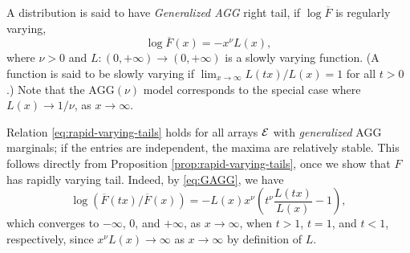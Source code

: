 % 

\begin{example} \label{exmp:AGG}
A distribution is said to have \emph{Generalized AGG} right tail, if $\log{\overline{F}}$ is regularly varying,
\begin{equation} \label{eq:GAGG}
    \log{\overline{F}(x)} = - x^\nu L(x),
\end{equation}
where $\nu>0$ and $L: (0,+\infty)\to(0,+\infty)$ is a slowly varying function. (A function is said to be slowly varying if $\lim_{x\to\infty}L(tx)/L(x) = 1$ for all $t>0$.) Note that the $\text{AGG}(\nu)$ model corresponds to the special case where $L(x)\to 1/\nu$, as $x\to\infty$.

Relation \eqref{eq:rapid-varying-tails} holds for all arrays $\cal E$ with \emph{generalized} AGG marginals; if the entries are independent, the maxima are relatively stable. 
This follows directly from Proposition \ref{prop:rapid-varying-tails}, once we show that $F$ has rapidly varying tail. 
Indeed, by \eqref{eq:GAGG}, we have
$$
\log{\left(\overline{F}(tx)\Big/ \overline{F}(x)\right)} = - L(x)x^\nu\left(t^\nu\frac{L(tx)}{L(x)} - 1\right),
$$
which converges to $-\infty$, 0, and $+\infty$, as $x\to\infty$, when $t>1$, $t=1$, and $t<1$, respectively, since $x^\nu L(x)\to\infty$ as $x\to\infty$ by definition of $L$.
\end{example}


